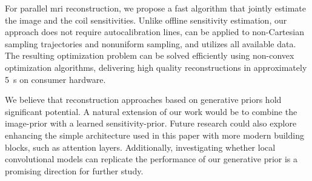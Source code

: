 For parallel \gls{mri} reconstruction, we propose a fast algorithm that jointly estimate the image and the coil sensitivities.
Unlike offline sensitivity estimation, our approach does not require autocalibration lines, can be applied to non-Cartesian sampling trajectories and nonuniform sampling, and utilizes all available data.
The resulting optimization problem can be solved efficiently using non-convex optimization algorithms, delivering high quality reconstructions in approximately \qty{5}{\second} on consumer hardware.

We believe that reconstruction approaches based on generative priors hold significant potential.
A natural extension of our work would be to combine the image-prior with a learned sensitivity-prior.
Future research could also explore enhancing the simple architecture used in this paper with more modern building blocks, such as attention layers.
Additionally, investigating whether local convolutional models can replicate the performance of our generative prior is a promising direction for further study.
